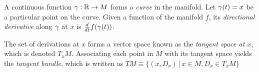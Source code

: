 \documentclass[11pt]{article}
\numberwithin{equation}{section}
\begin{document}
\begin{dfn}
A continuous function $\gamma :\mathbb{R}\rightarrow M$ forms a \textit{curve} in the manifold.
Let $\gamma (t)=x$ be a particular point on the curve.
Given a function of the manifold $f$, its \textit{directional derivative} along $\gamma $ at $x$ is
$
  \frac {d }{d t}
  f(\gamma (t))
$.
\end{dfn}

\begin{dfn}
The set of derivations at $x$ forms a vector space known as the \textit{tangent space at $x$}, which is denoted $T_xM$.
Associating each point in $M$ with its tangent space yields the \textit{tangent bundle}, which is written as
$
  TM
\equiv
  \{
    (x,D_x)
  \,|\,
    x\in M,
    D_x\in T_xM
  \}
$
\end{dfn}


\begin{thm}
\thmtitle{
}
\end{thm}
\end{document}
